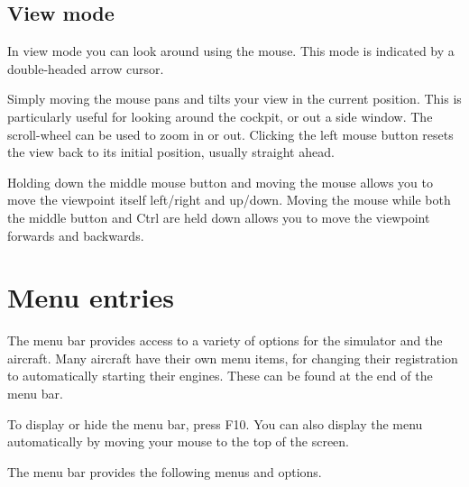 \subsection{View mode}

In view mode you can look around using the mouse. This mode is indicated by a double-headed
arrow cursor.

Simply moving the mouse pans and tilts your view in the current position. This is
particularly useful for looking around the cockpit, or out a side window. The
scroll-wheel can be used to zoom in or out. Clicking the left mouse button
resets the view back to its initial position, usually straight ahead.

Holding down the middle mouse button and moving the mouse allows you to move the viewpoint
itself left/right and up/down. Moving the mouse while both the middle button and Ctrl are
held down allows you to move the viewpoint forwards and backwards.

\section{Menu entries}

The menu bar provides access to a variety of options for the simulator and the aircraft.
Many aircraft have their own menu items, for changing their registration to automatically
starting their engines. These can be found at the end of the menu bar.

To display or hide the menu bar, press F10. You can also display the menu automatically
by moving your mouse to the top of the screen. 

The menu bar provides the following menus and options.

